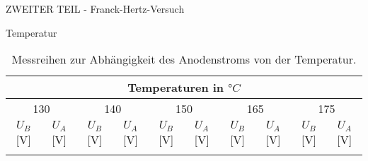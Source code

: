 \begin{appendix}
\begin{chapter}{ZWEITER TEIL - Franck-Hertz-Versuch}
\begin{section}{Temperatur}
      \begin{scriptsize}
        \begin{longtable}[htbp]{|c|c|c|c|c|c|c|c|c|c|}
          \hline
          \multicolumn{10}{|c|}{Temperaturen in $°C$} \\ \hline 
          \multicolumn{2}{|c|}{130} & \multicolumn{2}{|c|}{140} &
          \multicolumn{2}{|c|}{150} & \multicolumn{2}{|c|}{165} & 
          \multicolumn{2}{|c|}{175} \\ \hline
          $U_{B}$ [V] & $U_{A}$ [V] & $U_{B}$ [V] & $U_{A}$ [V] &
          $U_{B}$ [V] & $U_{A}$ [V] & $U_{B}$ [V] & $U_{A}$ [V] &
          $U_{B}$ [V] & $U_{A}$ [V] \\ \hline\hline \endhead
          
          \caption{Messreihen zur Abhängigkeit des Anodenstroms von der
              Temperatur.}
          \label{tab:FHtemperatur}
        \end{longtable}
      \end{scriptsize}
      
    \end{section}
    
  \end{chapter}
  
\end{appendix}
 